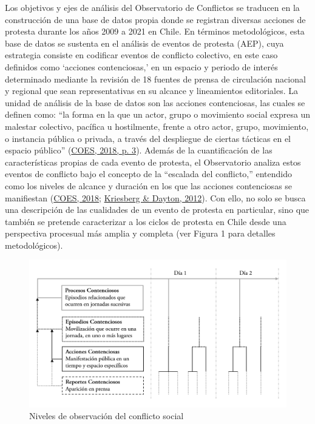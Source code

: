\documentclass[
  12pt,
]{article}
\begin{document}
Los objetivos y ejes de análisis del Observatorio de Conflictos se
traducen en la construcción de una base de datos propia donde se
registran diversas acciones de protesta durante los años 2009 a 2021 en
Chile. En términos metodológicos, esta base de datos se sustenta en el
análisis de eventos de protesta (AEP), cuya estrategia consiste en
codificar eventos de conflicto colectivo, en este caso definidos como
`acciones contenciosas,' en un espacio y periodo de interés determinado
mediante la revisión de 18 fuentes de prensa de circulación nacional y
regional que sean representativas en su alcance y lineamientos
editoriales. La unidad de análisis de la base de datos son las acciones
contenciosas, las cuales se definen como: ``la forma en la que un actor,
grupo o movimiento social expresa un malestar colectivo, pacífica u
hostilmente, frente a otro actor, grupo, movimiento, o instancia pública
o privada, a través del despliegue de ciertas tácticas en el espacio
público''
(\protect\hyperlink{ref-coesManualMetodologicoObservatorio2018}{COES,
2018, p. 3}). Además de la cuantificación de las características propias
de cada evento de protesta, el Observatorio analiza estos eventos de
conflicto bajo el concepto de la ``escalada del conflicto,'' entendido
como los niveles de alcance y duración en los que las acciones
contenciosas se manifiestan
(\protect\hyperlink{ref-coesManualMetodologicoObservatorio2018}{COES,
2018};
\protect\hyperlink{ref-kriesbergConstructiveConflictsEscalation2012}{Kriesberg
\& Dayton, 2012}). Con ello, no solo se busca una descripción de las
cualidades de un evento de protesta en particular, sino que también se
pretende caracterizar a los ciclos de protesta en Chile desde una
perspectiva procesual más amplia y completa (ver Figura 1 para detalles
metodológicos).

\begin{figure}[!ht]

{\centering \includegraphics[width=0.8\linewidth,]{user} 

}

\caption{Niveles de observación del conflicto social}\label{fig:fig1}
\end{figure}
\end{document}
